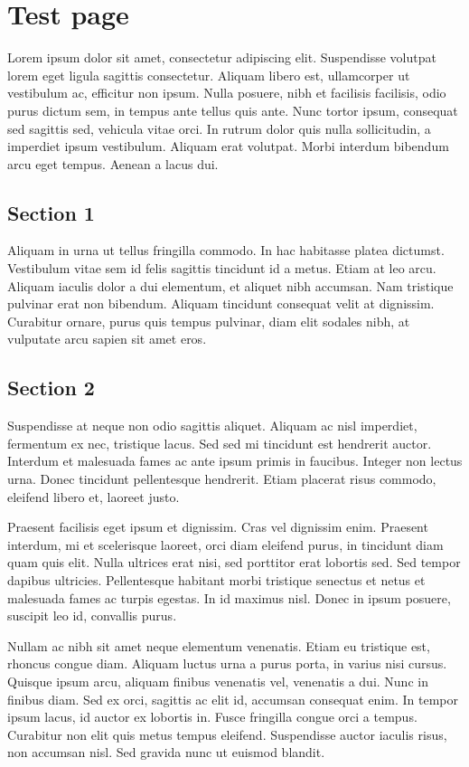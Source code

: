 \chapter{Test page}
Lorem ipsum dolor sit amet, consectetur adipiscing elit. Suspendisse volutpat lorem eget ligula sagittis consectetur. Aliquam libero est, ullamcorper ut vestibulum ac, efficitur non ipsum. Nulla posuere, nibh et facilisis facilisis, odio purus dictum sem, in tempus ante tellus quis ante. Nunc tortor ipsum, consequat sed sagittis sed, vehicula vitae orci. In rutrum dolor quis nulla sollicitudin, a imperdiet ipsum vestibulum. Aliquam erat volutpat. Morbi interdum bibendum arcu eget tempus. Aenean a lacus dui.

\section{Section 1}
Aliquam in urna ut tellus fringilla commodo. In hac habitasse platea dictumst. Vestibulum vitae sem id felis sagittis tincidunt id a metus. Etiam at leo arcu. Aliquam iaculis dolor a dui elementum, et aliquet nibh accumsan. Nam tristique pulvinar erat non bibendum. Aliquam tincidunt consequat velit at dignissim. Curabitur ornare, purus quis tempus pulvinar, diam elit sodales nibh, at vulputate arcu sapien sit amet eros.

\section{Section 2}
Suspendisse at neque non odio sagittis aliquet. Aliquam ac nisl imperdiet, fermentum ex nec, tristique lacus. Sed sed mi tincidunt est hendrerit auctor. Interdum et malesuada fames ac ante ipsum primis in faucibus. Integer non lectus urna. Donec tincidunt pellentesque hendrerit. Etiam placerat risus commodo, eleifend libero et, laoreet justo.

Praesent facilisis eget ipsum et dignissim. Cras vel dignissim enim. Praesent interdum, mi et scelerisque laoreet, orci diam eleifend purus, in tincidunt diam quam quis elit. Nulla ultrices erat nisi, sed porttitor erat lobortis sed. Sed tempor dapibus ultricies. Pellentesque habitant morbi tristique senectus et netus et malesuada fames ac turpis egestas. In id maximus nisl. Donec in ipsum posuere, suscipit leo id, convallis purus.

Nullam ac nibh sit amet neque elementum venenatis. Etiam eu tristique est, rhoncus congue diam. Aliquam luctus urna a purus porta, in varius nisi cursus. Quisque ipsum arcu, aliquam finibus venenatis vel, venenatis a dui. Nunc in finibus diam. Sed ex orci, sagittis ac elit id, accumsan consequat enim. In tempor ipsum lacus, id auctor ex lobortis in. Fusce fringilla congue orci a tempus. Curabitur non elit quis metus tempus eleifend. Suspendisse auctor iaculis risus, non accumsan nisl. Sed gravida nunc ut euismod blandit.